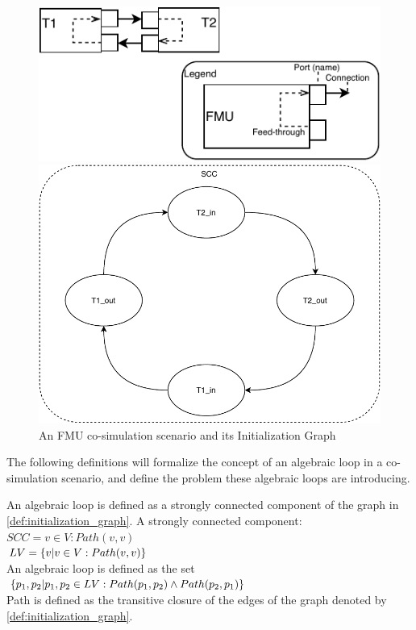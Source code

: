 \begin{figure}[H]
    \centering
    \begin{minipage}{0.55\textwidth}
        \centering
    \includegraphics[width=1\textwidth]{images/fmu_cycle.pdf}
    \end{minipage}\hfill
    \begin{minipage}{0.35\textwidth}
        \centering
    \includegraphics[width=1\textwidth]{images/SCC.pdf}
    \end{minipage}
    \caption{An FMU co-simulation scenario and its Initialization Graph}
    \label{fig:fmu_cycle}
\end{figure}

The following definitions will formalize the concept of an algebraic loop in a co-simulation scenario, and define the problem these algebraic loops are introducing. 

\begin{definition} 
An algebraic loop is defined as a strongly connected component of the graph in \cref{def:initialization_graph}. 
A strongly connected component: $SCC = v \in V: Path(v,v)$\\
$LV = \{v | v \in V : Path(v,v)\}$ \\
An algebraic loop is defined as the set $\{p_1, p_2 | p_1, p_2 \in LV: Path(p_1, p_2) \land Path(p_2, p_1)\}$\\
Path is defined as the transitive closure of the edges of the graph denoted by \cref{def:initialization_graph}.\\
\end{definition}

